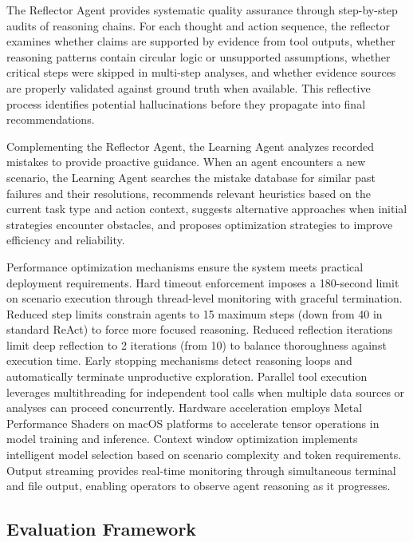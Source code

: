 \documentclass[conference]{IEEEtran}
\begin{document}
The Reflector Agent provides systematic quality assurance through step-by-step audits of reasoning chains. For each thought and action sequence, the reflector examines whether claims are supported by evidence from tool outputs, whether reasoning patterns contain circular logic or unsupported assumptions, whether critical steps were skipped in multi-step analyses, and whether evidence sources are properly validated against ground truth when available. This reflective process identifies potential hallucinations before they propagate into final recommendations.

Complementing the Reflector Agent, the Learning Agent analyzes recorded mistakes to provide proactive guidance. When an agent encounters a new scenario, the Learning Agent searches the mistake database for similar past failures and their resolutions, recommends relevant heuristics based on the current task type and action context, suggests alternative approaches when initial strategies encounter obstacles, and proposes optimization strategies to improve efficiency and reliability.

Performance optimization mechanisms ensure the system meets practical deployment requirements. Hard timeout enforcement imposes a 180-second limit on scenario execution through thread-level monitoring with graceful termination. Reduced step limits constrain agents to 15 maximum steps (down from 40 in standard ReAct) to force more focused reasoning. Reduced reflection iterations limit deep reflection to 2 iterations (from 10) to balance thoroughness against execution time. Early stopping mechanisms detect reasoning loops and automatically terminate unproductive exploration. Parallel tool execution leverages multithreading for independent tool calls when multiple data sources or analyses can proceed concurrently. Hardware acceleration employs Metal Performance Shaders on macOS platforms to accelerate tensor operations in model training and inference. Context window optimization implements intelligent model selection based on scenario complexity and token requirements. Output streaming provides real-time monitoring through simultaneous terminal and file output, enabling operators to observe agent reasoning as it progresses.

\subsection{Evaluation Framework}
\end{document}
